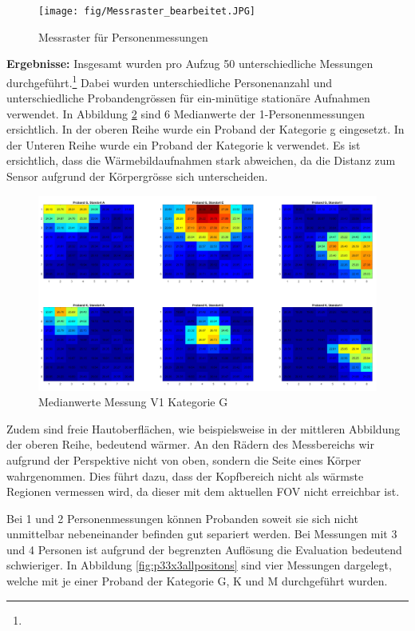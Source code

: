 \begin{figure}[H]
	\centering
	\texttt{[image: fig/Messraster\_bearbeitet.JPG]}
	\caption[Messraster für Personenmessungen]{Messraster für Personenmessungen}
	\label{fig:Messraster}
\end{figure}

\textbf{Ergebnisse:} Insgesamt wurden pro Aufzug 50 unterschiedliche Messungen durchgeführt.\footnote[20]{} Dabei wurden unterschiedliche Personenanzahl und unterschiedliche Probandengrössen für ein-minütige stationäre Aufnahmen verwendet. In Abbildung \ref{fig:p1gallpositionsmean} sind 6 Medianwerte der 1-Personenmessungen ersichtlich. In der oberen Reihe wurde ein Proband der Kategorie g eingesetzt. In der Unteren Reihe wurde ein Proband der Kategorie k verwendet. Es ist ersichtlich, dass die Wärmebildaufnahmen stark abweichen, da die Distanz zum Sensor aufgrund der Körpergrösse sich unterscheiden.

\begin{figure}[H]
	\centering
	\includegraphics[width=1.0\textwidth]{fig/p1_k_g_aei.jpg}
	\caption[Medianwerte Messung V1 Kategorie G]{Medianwerte Messung V1 Kategorie G}
	\label{fig:p1gallpositionsmean}
\end{figure}

Zudem sind freie Hautoberflächen, wie beispielsweise in der mittleren Abbildung der oberen Reihe, bedeutend wärmer. An den Rädern des Messbereichs wir aufgrund der Perspektive nicht von oben, sondern die Seite eines Körper wahrgenommen. Dies führt dazu, dass der Kopfbereich nicht als wärmste Regionen vermessen wird, da dieser mit dem aktuellen \ac{FOV} nicht erreichbar ist.

Bei 1 und 2 Personenmessungen können Probanden soweit sie sich nicht unmittelbar nebeneinander befinden gut separiert werden. Bei Messungen mit 3 und 4 Personen ist aufgrund der begrenzten Auflösung die Evaluation bedeutend schwieriger. In Abbildung \ref{fig:p33x3allpositons} sind vier Messungen dargelegt, welche mit je einer Proband der Kategorie G, K und M durchgeführt wurden.


